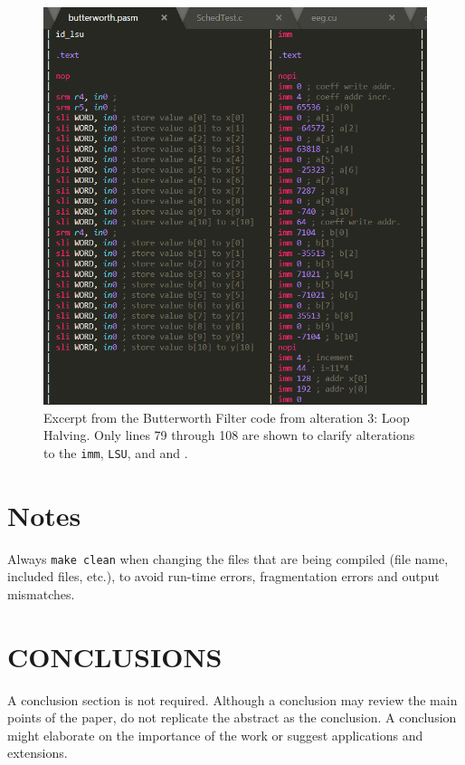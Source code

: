 \documentclass[letterpaper, 10 pt, conference]{ieeeconf}  %
\begin{document}
\begin{figure}[h]
\begin{center}
\includegraphics[scale=0.35]{images/assem01.png}
\caption{Excerpt from the Butterworth Filter code from alteration 3: Loop Halving. Only lines 79 through 108 are shown to clarify alterations to the \texttt{imm}, \texttt{LSU}, and and .}
\label{fig:TODO}
\end{center}
\end{figure}





\section{Notes}
Always \texttt{make clean} when changing the files that are being compiled (file name, included files, etc.), to avoid run-time errors, fragmentation errors and output mismatches.


\section{CONCLUSIONS}

A conclusion section is not required. Although a conclusion may review the main points of the paper, do not replicate the abstract as the conclusion. A conclusion might elaborate on the importance of the work or suggest applications and extensions. 
\end{document}
